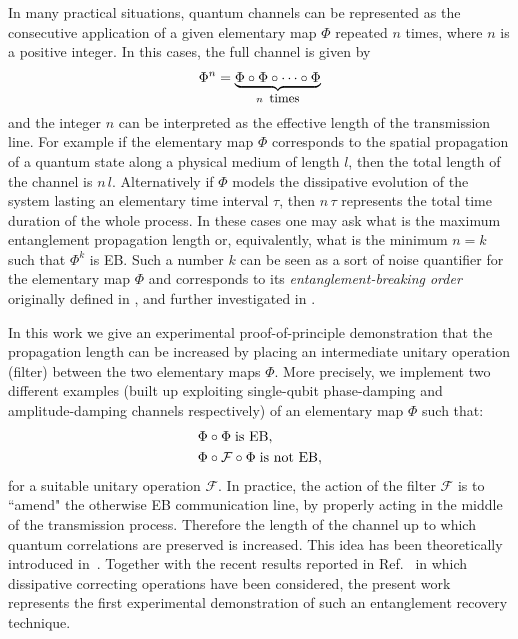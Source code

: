 \documentclass[aps,twocolumn,pra,superscriptaddress,showpacs,showkeys,floatfix]{revtex4-1}
\begin{document}
In many practical situations, quantum channels can be represented as the consecutive application of a given elementary map $\Phi$ repeated $n$ times, where $n$ is a positive integer. In this cases, the full channel is given by
\begin{align}
\Phi^n=\underbrace{\Phi\circ \Phi \circ \cdots \circ \Phi}_{n \;\; \mbox{{\small times}} }
\end{align}	
and the integer $n$ can be interpreted as the effective length of the transmission line. For example if the elementary map $\Phi$ corresponds to the spatial propagation of a quantum state along a physical medium of length $l$, then the total length of the channel is $n\, l$. Alternatively if $\Phi$ models the dissipative evolution of the system lasting  an elementary time interval $\tau$, then $n\, \tau$ represents the total time duration of the whole process. In these cases one may ask what is the maximum entanglement propagation length or, equivalently, what is the minimum $n=k$ such that $\Phi^k$ is EB. Such a number $k$ can be seen as a sort of noise quantifier for the elementary map $\Phi$  and corresponds to  its  {\it entanglement-breaking order}  originally defined in \cite{depasquale2012}, and further investigated in \cite{depasquale2013,lami2015,cutandpaste}.

In this work we give an experimental proof-of-principle demonstration that the propagation length can be increased by placing an intermediate unitary operation (filter) between the two elementary maps $\Phi$. More precisely, we implement two different examples (built up exploiting single-qubit phase-damping and amplitude-damping channels respectively) of an elementary map $\Phi$ such that:
\begin{align}
&\Phi\circ \Phi  \; {\rm is\ EB,} \label{filt1}\\
&\Phi \circ \mathcal F  \circ \Phi  \; {\rm is\ not\ EB,} \label{filt2}
\end{align}
for a suitable unitary operation $\mathcal F$. In practice, the action of the filter $\mathcal F$ is to ``amend" the otherwise EB communication line, by properly acting in the middle of the transmission process. Therefore the length of the channel up to which quantum correlations are preserved is increased. This idea has been theoretically introduced in~\cite{depasquale2012}.
Together with the recent results reported in Ref.\ \cite{cutandpaste} in which dissipative correcting operations have been considered, the present work represents the first experimental demonstration of such an entanglement recovery technique.
\end{document}
